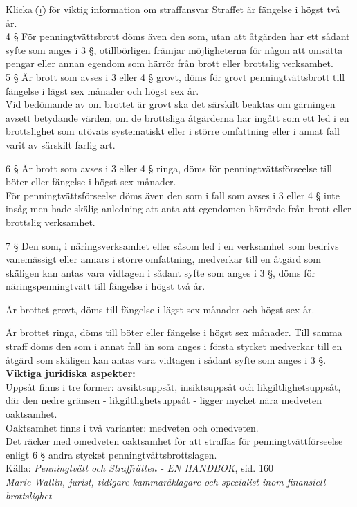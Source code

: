 \documentclass[10pt]{beamer}
\begin{document}
\begin{alertblock}{Klicka ⓘ för viktig information om straffansvar}
   \tiny Straffet är fängelse i högst två år.\\

  \tiny 4 §   För penningtvättsbrott döms även den som, utan att åtgärden har ett sådant syfte som anges i 
  3 §, otillbörligen främjar möjligheterna för någon att omsätta pengar eller annan egendom som härrör 
  från brott eller brottslig verksamhet.\\

  \tiny 5 §   Är brott som avses i 3 eller 4 § grovt, döms för grovt penningtvättsbrott till fängelse 
  i lägst sex månader och högst sex år.\\

  \tiny Vid bedömande av om brottet är grovt ska det särskilt beaktas om gärningen avsett betydande värden, 
  om de brottsliga åtgärderna har ingått som ett led i en brottslighet som utövats systematiskt 
  eller i större omfattning eller i annat fall varit av särskilt farlig art.

  \tiny 6 §   Är brott som avses i 3 eller 4 § ringa, döms för penningtvättsförseelse till böter eller 
  fängelse i högst sex månader.\\

  \tiny För penningtvättsförseelse döms även den som i fall som avses i 3 eller 4 § inte insåg men 
  hade skälig anledning att anta att egendomen härrörde från brott eller brottslig verksamhet.

  \tiny 7 §   Den som, i näringsverksamhet eller såsom led i en verksamhet som bedrivs vanemässigt eller 
  annars i större omfattning, medverkar till en åtgärd som skäligen kan antas vara vidtagen i sådant 
  syfte som anges i 3 §, döms för näringspenningtvätt till fängelse i högst två år.

  \tiny Är brottet grovt, döms till fängelse i lägst sex månader och högst sex år.

  \tiny Är brottet ringa, döms till böter eller fängelse i högst sex månader. Till samma straff döms 
  den som i annat fall än som anges i första stycket medverkar till en åtgärd som skäligen 
  kan antas vara vidtagen i sådant syfte som anges i 3 §.\\[0.2cm]

  \textbf{Viktiga juridiska aspekter:}\\
  \tiny \textbullet Uppsåt finns i tre former: avsiktsuppsåt, insiktsuppsåt och likgiltlighetsuppsåt, där den nedre
  gränsen - likgiltlighetsuppsåt - ligger mycket nära medveten oaktsamhet.\\
  \tiny \textbullet Oaktsamhet finns i två varianter: medveten och omedveten.\\
  \tiny \textbullet Det räcker med omedveten oaktsamhet för att straffas för penningtvättförseelse enligt 6 §
  andra stycket penningtvättsbrottslagen.\\[0.2cm]
  \tiny Källa: \textit{Penningtvätt och Straffrätten - EN HANDBOK}, sid. 160\\
  \tiny \textit{Marie Wallin, jurist, tidigare kammaråklagare och specialist inom finansiell brottslighet}


\end{alertblock}
\end{document}
